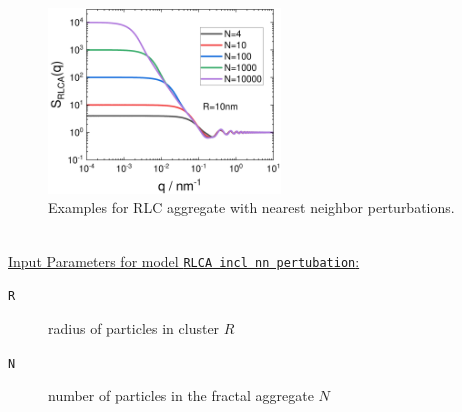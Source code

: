 \begin{figure}[htb]
\begin{center}
\includegraphics[width=0.55\textwidth]{../images/structure_factor/MassFractals/RLCAinclNN.pdf}
\end{center}
\caption{Examples for RLC aggregate with nearest neighbor perturbations.}
\label{fig:SQ_RLCA_NN}
\end{figure}

~\\
\noindent \uline{Input Parameters for model \texttt{RLCA incl nn pertubation}:}
\begin{description}
\item[\texttt{R}] radius of particles in cluster $R$
\item[\texttt{N}] number of particles in the fractal aggregate $N$
\end{description} 